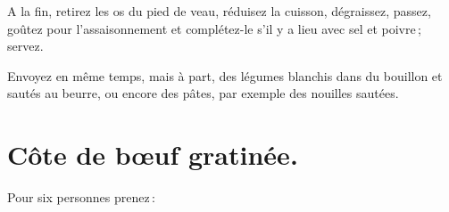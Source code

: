 A la fin, retirez les os du pied de veau, réduisez la cuisson, dégraissez,
passez, goûtez pour l'assaisonnement et complétez-le s'il y a lieu avec sel et
poivre ; servez.

Envoyez en même temps, mais à part, des légumes blanchis dans du bouillon et
sautés au beurre, ou encore des pâtes, par exemple des nouilles sautées.

\section*{\centering Côte de bœuf gratinée.}
{}

Pour six personnes prenez :

\medskip

